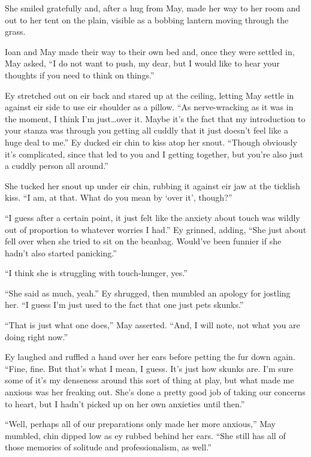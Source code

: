 She smiled gratefully and, after a hug from May, made her way to her room and out to her tent on the plain, visible as a bobbing lantern moving through the grass.

Ioan and May made their way to their own bed and, once they were settled in, May asked, ``I do not want to push, my dear, but I would like to hear your thoughts if you need to think on things.''

Ey stretched out on eir back and stared up at the ceiling, letting May settle in against eir side to use eir shoulder as a pillow. ``As nerve-wracking as it was in the moment, I think I'm just\ldots over it. Maybe it's the fact that my introduction to your stanza was through you getting all cuddly that it just doesn't feel like a huge deal to me.'' Ey ducked eir chin to kiss atop her snout. ``Though obviously it's complicated, since that led to you and I getting together, but you're also just a cuddly person all around.''

She tucked her snout up under eir chin, rubbing it against eir jaw at the ticklish kiss. ``I am, at that. What do you mean by `over it', though?''

``I guess after a certain point, it just felt like the anxiety about touch was wildly out of proportion to whatever worries I had.'' Ey grinned, adding, ``She just about fell over when she tried to sit on the beanbag. Would've been funnier if she hadn't also started panicking.''

``I think she is struggling with touch-hunger, yes.''

``She said as much, yeah.'' Ey shrugged, then mumbled an apology for jostling her. ``I guess I'm just used to the fact that one just pets skunks.''

``That is just what one does,'' May asserted. ``And, I will note, not what you are doing right now.''

Ey laughed and ruffled a hand over her ears before petting the fur down again. ``Fine, fine. But that's what I mean, I guess. It's just how skunks are. I'm sure some of it's my denseness around this sort of thing at play, but what made me anxious was her freaking out. She's done a pretty good job of taking our concerns to heart, but I hadn't picked up on her own anxieties until then.''

``Well, perhaps all of our preparations only made her more anxious,'' May mumbled, chin dipped low as ey rubbed behind her ears. ``She still has all of those memories of solitude and professionalism, as well.''

